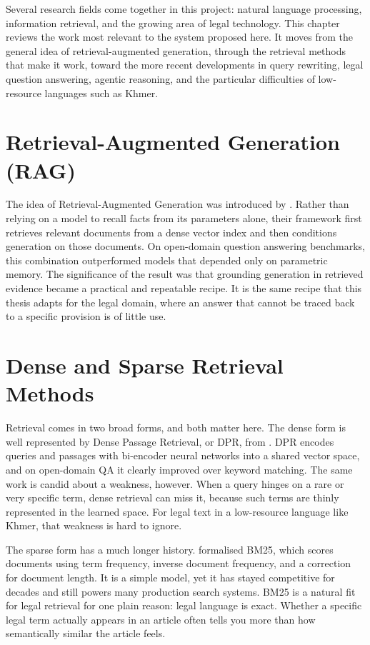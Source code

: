 
\hs Several research fields come together in this project: natural language processing,
information retrieval, and the growing area of legal technology. This chapter reviews the
work most relevant to the system proposed here. It moves from the general idea of
retrieval-augmented generation, through the retrieval methods that make it work, toward
the more recent developments in query rewriting, legal question answering, agentic
reasoning, and the particular difficulties of low-resource languages such as Khmer.

\section{Retrieval-Augmented Generation (RAG)}

\hs The idea of Retrieval-Augmented Generation was introduced by \citet{lewis2020rag}.
Rather than relying on a model to recall facts from its parameters alone, their framework
first retrieves relevant documents from a dense vector index and then conditions
generation on those documents. On open-domain question answering benchmarks, this
combination outperformed models that depended only on parametric memory. The significance
of the result was that grounding generation in retrieved evidence became a practical and
repeatable recipe. It is the same recipe that this thesis adapts for the legal domain,
where an answer that cannot be traced back to a specific provision is of little use.

\section{Dense and Sparse Retrieval Methods}

\hs Retrieval comes in two broad forms, and both matter here. The dense form is well
represented by Dense Passage Retrieval, or DPR, from \citet{karpukhin2020dpr}. DPR
encodes queries and passages with bi-encoder neural networks into a shared vector space,
and on open-domain QA it clearly improved over keyword matching. The same work is candid
about a weakness, however. When a query hinges on a rare or very specific term, dense
retrieval can miss it, because such terms are thinly represented in the learned space.
For legal text in a low-resource language like Khmer, that weakness is hard to ignore.

\hs The sparse form has a much longer history. \citet{robertson2009bm25} formalised
BM25, which scores documents using term frequency, inverse document frequency, and a
correction for document length. It is a simple model, yet it has stayed competitive for
decades and still powers many production search systems. BM25 is a natural fit for legal
retrieval for one plain reason: legal language is exact. Whether a specific legal term
actually appears in an article often tells you more than how semantically similar the
article feels.

